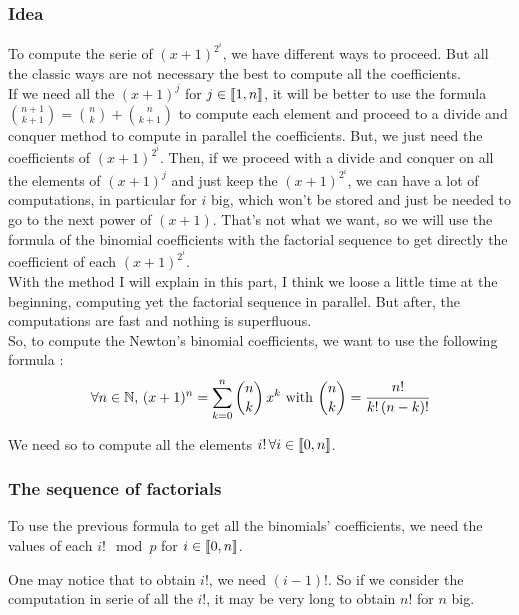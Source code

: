 
\subsubsection{Idea}

To compute the serie of $(x+1)^{2^i}$, we have different ways to proceed. But all the classic ways are not necessary the best to compute all the coefficients. \\

If we need all the $(x+1)^j$ for $j \in \mbox{\textlbrackdbl} 1, n\mbox{\textrbrackdbl}$, it will be better to use the formula ${n+1 \choose k+1} = {n \choose k} + {n \choose k+1}$ to compute each element and proceed to a divide and conquer method to compute in parallel the coefficients. But, we just need the coefficients of $(x+1)^{2^i}$. Then, if we proceed with a divide and conquer on all the elements of $(x+1)^j$ and just keep the $(x+1)^{2^i}$, we can have a lot of computations, in particular for $i$ big, which won't be stored and just be needed to go to the next power of $(x+1)$. That's not what we want, so we will use the formula of the binomial coefficients with the factorial sequence to get directly the coefficient of each $(x+1)^{2^i}$. \\

With the method I will explain in this part, I think we loose a little time at the beginning, computing yet the factorial sequence in parallel. But after, the computations are fast and nothing is superfluous.\\

So, to compute the Newton's binomial coefficients, we want to use the following formula :
$$\forall n\in \mathbb{N},\, (x+1)^n = \sum_{k=0}^{n} {n \choose k}\, x^k \mbox{ with } {n \choose k} = \cfrac{n!}{k!\, (n-k)!}$$

We need so to compute all the elements $i!\, \forall i\in \mbox{\textlbrackdbl} 0, n\mbox{\textrbrackdbl}$.

\subsubsection{The sequence of factorials}

To use the previous formula to get all the binomials' coefficients, we need the values of each $i!\mod p$ for $i \in \mbox{\textlbrackdbl} 0, n\mbox{\textrbrackdbl}$.

One may notice that to obtain $i!$, we need $(i-1)!$. So if we consider the computation in serie of all the $i!$, it may be very long to obtain $n!$ for $n$ big. \\


